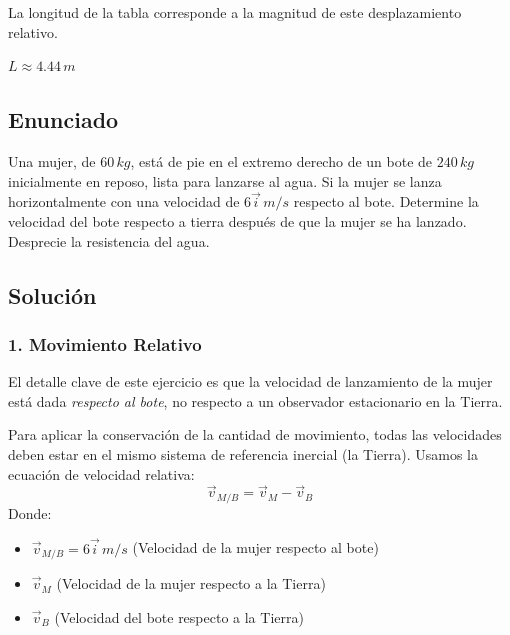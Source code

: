 \documentclass[12pt, a4paper]{article}
\begin{document}
La longitud de la tabla corresponde a la magnitud de este desplazamiento relativo.

\begin{tcolorbox}[colback=green!5!white, colframe=green!50!black, title=Respuesta Final]
\centering \Large $L \approx 4.44 \, \si{m}$
\end{tcolorbox}

\newpage

\subsection*{Enunciado}
Una mujer, de $60 \, \si{kg}$, está de pie en el extremo derecho de un bote de $240 \, \si{kg}$ inicialmente en reposo, lista para lanzarse al agua. Si la mujer se lanza horizontalmente con una velocidad de $6\vec{i} \, \si{m/s}$ respecto al bote. Determine la velocidad del bote respecto a tierra después de que la mujer se ha lanzado. Desprecie la resistencia del agua.

\begin{center}
\end{center}

\subsection*{Solución}

\subsubsection*{1. Movimiento Relativo}
El detalle clave de este ejercicio es que la velocidad de lanzamiento de la mujer está dada \textit{respecto al bote}, no respecto a un observador estacionario en la Tierra. 

Para aplicar la conservación de la cantidad de movimiento, todas las velocidades deben estar en el mismo sistema de referencia inercial (la Tierra). Usamos la ecuación de velocidad relativa:
\[ \vec{v}_{M/B} = \vec{v}_M - \vec{v}_B \]
Donde:
\begin{itemize}
    \item $\vec{v}_{M/B} = 6\vec{i} \, \si{m/s}$ (Velocidad de la mujer respecto al bote)
    \item $\vec{v}_M$ (Velocidad de la mujer respecto a la Tierra)
    \item $\vec{v}_B$ (Velocidad del bote respecto a la Tierra)
\end{itemize}
\end{document}

